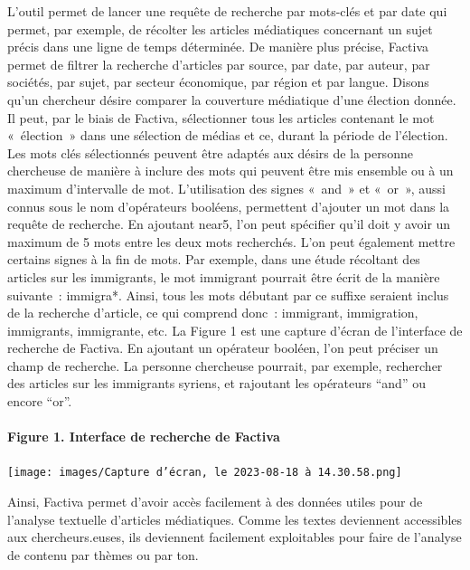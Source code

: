 \documentclass[
  letterpaper,
]{scrbook}
\let\oldparagraph\paragraph
\renewcommand{\paragraph}[1]{\oldparagraph{#1}\mbox{}}
\begin{document}
L'outil permet de lancer une requête de recherche par mots-clés et par
date qui permet, par exemple, de récolter les articles médiatiques
concernant un sujet précis dans une ligne de temps déterminée. De
manière plus précise, Factiva permet de filtrer la recherche d'articles
par source, par date, par auteur, par sociétés, par sujet, par secteur
économique, par région et par langue. Disons qu'un chercheur désire
comparer la couverture médiatique d'une élection donnée. Il peut, par le
biais de Factiva, sélectionner tous les articles contenant le mot
«~élection~» dans une sélection de médias et ce, durant la période de
l'élection. Les mots clés sélectionnés peuvent être adaptés aux désirs
de la personne chercheuse de manière à inclure des mots qui peuvent être
mis ensemble ou à un maximum d'intervalle de mot. L'utilisation des
signes «~and~» et «~or~», aussi connus sous le nom d'opérateurs
booléens, permettent d'ajouter un mot dans la requête de recherche. En
ajoutant near5, l'on peut spécifier qu'il doit y avoir un maximum de 5
mots entre les deux mots recherchés. L'on peut également mettre certains
signes à la fin de mots. Par exemple, dans une étude récoltant des
articles sur les immigrants, le mot immigrant pourrait être écrit de la
manière suivante~: immigra*. Ainsi, tous les mots débutant par ce
suffixe seraient inclus de la recherche d'article, ce qui comprend
donc~: immigrant, immigration, immigrants, immigrante, etc. La Figure 1
est une capture d'écran de l'interface de recherche de Factiva. En
ajoutant un opérateur booléen, l'on peut préciser un champ de recherche.
La personne chercheuse pourrait, par exemple, rechercher des articles
sur les immigrants syriens, et rajoutant les opérateurs ``and'' ou
encore ``or''.

\hypertarget{figure-1.-interface-de-recherche-de-factiva}{%
\paragraph{Figure 1. Interface de recherche de
Factiva}\label{figure-1.-interface-de-recherche-de-factiva}}

\texttt{[image: images/Capture d’écran, le 2023-08-18 à 14.30.58.png]}

Ainsi, Factiva permet d'avoir accès facilement à des données utiles pour
de l'analyse textuelle d'articles médiatiques. Comme les textes
deviennent accessibles aux chercheurs.euses, ils deviennent facilement
exploitables pour faire de l'analyse de contenu par thèmes ou par ton.
\end{document}
